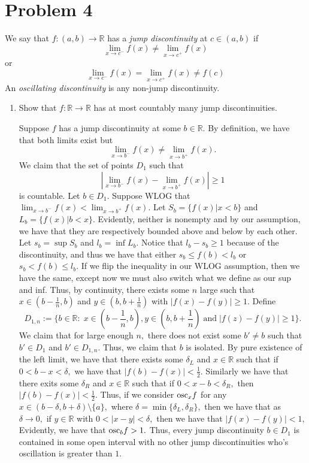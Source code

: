 \documentclass[11pt]{article}
\newcommand{\bbR}{\mathbb{R}}
\newcommand{\sm}{\setminus}
\begin{document}
\section*{Problem 4}
\begin{problem}
    We say that $f:(a,b)\to \bbR$ has a \textit{jump discontinuity} at $c\in (a,b)$ if 
    \[\lim_{x\to c^-}f(x)\neq \lim_{x\to c^+}f(x)\] or \[\lim_{x\to c^-}f(x) = \lim_{x\to c^+}f(x)\neq f(c)\] An \textit{oscillating discontinuity} is any non-jump discontinuity.
\end{problem}
\begin{enumerate}
    \item 
    \begin{problem}
        Show that $f: \bbR \to \bbR$ has at most countably many jump discontinuities.
    \end{problem}
    \begin{solution}
    Suppose $f$ has a jump discontinuity at some $b\in \bbR.$ By definition, we have that both limits exist but
    \[\displaystyle\lim_{x\to b^-}f(x)\neq \displaystyle\lim_{x\to b^+}f(x).\] We claim that the set of points $D_1$ such that \[|\lim_{x\to b^-}f(x)- \lim_{x\to b^+}f(x)|\geq 1\] is countable. Let $b\in D_1.$ Suppose WLOG that $\displaystyle\lim_{x\to b^-}f(x) < \displaystyle\lim_{x\to b^+}f(x).$ Let $S_b = \{f(x) | x<b\}$ and $L_b = \{f(x) | b<x\}.$ Evidently, neither is nonempty and by our assumption, we have that they are respectively bounded above and below by each other. Let $s_b = \sup S_b$ and $l_b = \inf L_b.$ Notice that $l_b - s_b \geq 1$ because of the discontinuity, and thus we have that either $s_b\leq f(b)< l_b$ or $s_b<f(b)\leq l_b.$ If we flip the inequality in our WLOG assumption, then we have the same, except now we must also switch what we define as our sup and inf. Thus, by continuity, there exists some $n$ large such that $x\in (b-\frac{1}{n}, b)$ and $y\in (b, b+ \frac{1}{n})$ with $|f(x) - f(y)|\geq 1.$ Define
    \[D_{1,n} := \{b\in \bbR: \; x\in (b-\frac{1}{n}, b), y\in (b, b+ \frac{1}{n}) \; \text{and}\; |f(z) - f(y)|\geq 1\}.\] We claim that for large enough $n,$ there does not exist some $b' \neq b$ such that $b' \in D_1$ and $b' \in D_{1,n}.$ Thus, we claim that $b$ is isolated. By pure existence of the left limit, we have that there exists some $\delta_L$ and $x\in \bbR$ such that if $0<b-x<\delta,$ we have that $|f(b) - f(x)|<\frac{1}{2}.$ Similarly we have that there exits some $\delta_R$ and $x\in \bbR$ such that if $0<x-b<\delta_R,$ then $|f(b) - f(x)|<\frac{1}{2}.$ Thus, if we consider $\text{osc}_{x}f$ for any $x\in (b-\delta, b+ \delta)\sm\{a\},$ where $\delta = \min\{\delta_L, \delta_R\},$ then we have that as $\delta \to 0,$ if $y\in \bbR$ with $0<|x-y|<\delta,$ then we have that $|f(x) - f(y)|<1,$ Evidently, we have that $\text{osc}_{b}f >1.$ Thus, every jump discontinuity $b\in D_1$ is contained in some open interval with no other jump discontinuities who's oscillation is greater than $1$.\\
    

\end{solution}
\end{enumerate}
\end{document}
